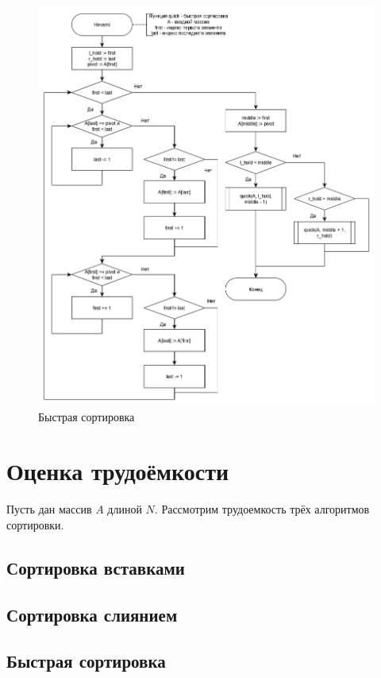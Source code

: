 \documentclass[12pt, a4paper]{report}
\begin{document}
	\begin{figure}[ht!]
		\centering
		\includegraphics[scale=0.55]{quick.png}
		\caption{Быстрая сортировка}
		\label{pic:quick}
	\end{figure}

	\newpage

	\section{Оценка трудоёмкости}
	Пусть дан массив $A$ длиной $N$. Рассмотрим трудоемкость трёх алгоритмов сортировки.
	
	\subsection{Сортировка вставками}
	
	\subsection{Сортировка слиянием}
	
	\subsection{Быстрая сортировка}
\end{document}
